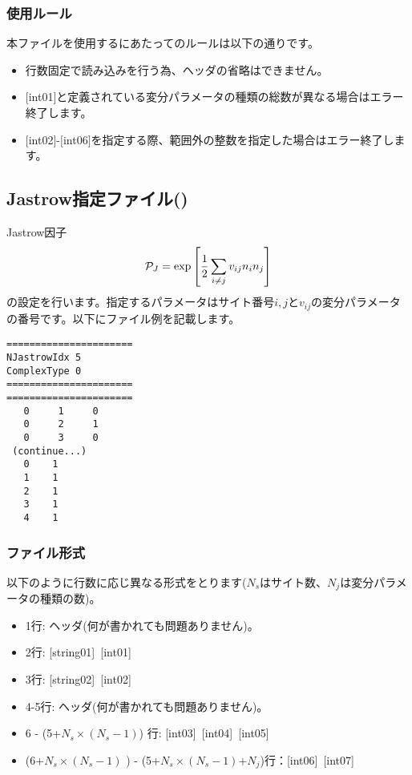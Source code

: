 \subsubsection{使用ルール}
本ファイルを使用するにあたってのルールは以下の通りです。
\begin{itemize}
\item 行数固定で読み込みを行う為、ヘッダの省略はできません。
\item $[$int01$]$と定義されている変分パラメータの種類の総数が異なる場合はエラー終了します。
\item $[$int02$]$-$[$int06$]$を指定する際、範囲外の整数を指定した場合はエラー終了します。
\end{itemize}

\newpage
\subsection{Jastrow指定ファイル()}
\label{Subsec:Jastrow}
Jastrow因子
\begin{equation}
{\cal P}_J=\exp\left[\frac{1}{2} \sum_{i\neq j} v_{ij} n_i n_j\right]
\end{equation}
の設定を行います。指定するパラメータはサイト番号$i, j$と$v_{ij}$の変分パラメータの番号です。以下にファイル例を記載します。

\begin{minipage}{12.5cm}
\begin{screen}
\begin{verbatim}
======================
NJastrowIdx 5  
ComplexType 0
====================== 
======================
   0     1     0 
   0     2     1 
   0     3     0 
 (continue...)
   0    1 
   1    1 
   2    1 
   3    1 
   4    1 
\end{verbatim}
\end{screen}
\end{minipage}

\subsubsection{ファイル形式}
以下のように行数に応じ異なる形式をとります($N_s$はサイト数、$N_j$は変分パラメータの種類の数)。
 \begin{itemize}
   \item  1行:  ヘッダ(何が書かれても問題ありません)。
   \item  2行:   [string01]~[int01]
   \item  3行:   [string02]~[int02]
   \item  4-5行:  ヘッダ(何が書かれても問題ありません)。
   \item  6 - (5+$N_s\times (N_s-1)$) 行: [int03]~[int04]~[int05]
   \item  (6+$N_s\times (N_s-1)$ ) - (5+$N_s\times (N_s-1)$+$N_j$)行：[int06]~[int07]
  \end{itemize}
